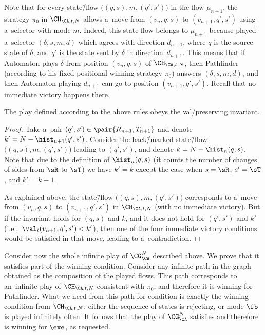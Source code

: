 Note that for every state\=/flow $\big((q,s),m,(q',s')\big)$ in the flow $\mu_{n+1}$, the strategy $\pi_0$ in $\CH_{\CA,t,N}$ allows a~move from $(v_n,q,s)$ to $(v_{n+1},q',s')$ using a~selector with mode $m$.
Indeed, this state flow belongs to $\mu_{n+1}$ because \eve played a~selector $(\delta,s,m,d)$ which agrees with direction $d_{n+1}$,
where $q$ is the source state of $\delta$, and $q'$ is the state sent by $\delta$ in direction~$d_{n+1}$.
This means that if Automaton plays $\delta$ from position $(v_n,q,s)$ of $\CH_{\CA,t,N}$, then Pathfinder (according to his fixed positional winning strategy $\pi_0$) answers $(\delta,s,m,d)$,
and then Automaton playing $d_{n+1}$ can go to position $(v_{n+1},q',s')$.
Recall that no immediate victory happens there.

\begin{clm}\label{claim-invariant}
The play defined according to the above rules obeys the val\=/preserving invariant.
\end{clm}

\begin{proof}
	Take a~pair $(q',s')\in\pair{R_{n+1},T_{n+1}}$ and denote $k'=N-\hist_{n+1}(q',s')$.
	Consider the back\=/marked state\=/flow $\big((q,s),m,(q',s')\big)$ leading to $(q',s')$, and denote $k=N-\hist_{n}(q,s)$.
	Note that due to the definition of $\hist_n(q,s)$ (it counts the number of changes of sides from $\sR$ to $\sT$) we have $k'=k$ except the case when $s=\sR$, $s'=\sT$, and $k'=k{-}1$.
	
	As explained above, the state\=/flow $\big((q,s),m,(q',s')\big)$ corresponds to a~move from $(v_n,q,s)$ to $(v_{n+1},q',s')$ in $\CH_{\CA,t,N}$ (with no immediate victory).
	But if the invariant holds for $(q,s)$ and $k$, and it does not hold for $(q',s')$ and $k'$ (i.e.,~$\val_t(v_{n+1},q',s')< k'$),
	then one of the four immediate victory conditions would be satisfied in that move, leading to a~contradiction.
\end{proof}

Consider now the whole infinite play of $\CG^N_\CA$ described above.
We prove that it satisfies part  of the winning condition.
Consider any infinite path in the graph obtained as the composition of the played flows.
This path corresponds to an~infinite play of $\CH_{\CA,t,N}$ consistent with $\pi_0$, and therefore it is winning for Pathfinder.
What we need from this path for condition  is exactly the winning condition from $\CH_{\CA,t,N}$: either the sequence of states is rejecting, or mode $\fb$ is played infinitely often.
It follows that the play of $\CG^N_\CA$ satisfies  and therefore is winning for $\eve$, as requested.

